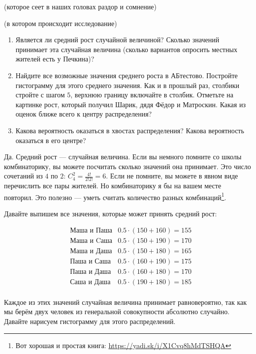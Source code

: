 \documentclass[12pt, a4paper, oneside]{article}
\theoremstyle{plain} %
\theoremstyle{definition}
\begin{document}
\begin{problem}{(которое сеет в наших головах раздор и сомнение)}
\begin{problem}{(в котором происходит исследование)}
\begin{enumerate} 
	\item[а)] Является ли средний рост случайной величиной? Сколько значений принимает эта случайная величина (сколько вариантов опросить местных жителей есть у Печкина)?
	\item[б)] Найдите все возможные значения среднего роста в АБтестово. Постройте гистограмму для этого среднего значения. Как и в прошлый раз, столбики стройте с шагом $5$, верхнюю границу включайте в столбик. Отметьте на картинке рост, который получил Шарик, дядя Фёдор и Матроскин. Какая из оценок ближе всего к центру распределения? 
	\item[в)] Какова вероятность оказаться в хвостах распределения? Какова вероятность оказаться в его центре? 
\end{enumerate} 
\end{problem}

\begin{solution}
Да. Средний рост --- случайная величина. Если вы немного помните со школы комбинаторику, вы можете посчитать сколько значений она принимает. Это число сочетаний из $4$ по $2$:  $C_4^2 = \frac{4!}{2!2!} =  6$. Если не помните, вы можете в явном виде перечислить все пары жителей. Но комбинаторику я бы на вашем месте повторил. Это полезно --- уметь считать количество разных комбинаций\footnote{Вот хорошая и простая книга: \url{https://yadi.sk/i/X1Cvq8hMdTSHQA}}.  

Давайте выпишем все значения, которые может принять средний рост: 

\begin{equation*}
\begin{aligned}
& \text{Маша и Паша}  & 0.5 \cdot (150 + 160) = 155 \\
& \text{Маша и Cаша}  & 0.5 \cdot (150 + 190) = 170 \\
& \text{Маша и Даша}  & 0.5 \cdot (150 + 180) = 165 \\
& \text{Паша и Саша}  & 0.5 \cdot (160 + 190) = 175 \\
& \text{Паша и Даша}  & 0.5 \cdot (160 + 180) =  170 \\
& \text{Саша и Даша}  & 0.5 \cdot (190 + 180) =  185 \\
\end{aligned} 
\end{equation*}

Каждое из этих значений случайная величина принимает равновероятно, так как мы берём двух человек из генеральной совокупности абсолютно случайно.  Давайте нарисуем гистограмму для этого распределений. 


\end{solution}
\end{problem}
\end{document}
